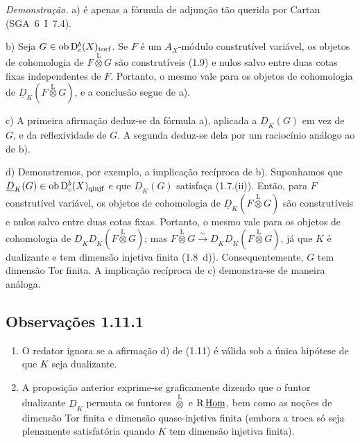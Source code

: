 \emph{Demonstração.} a) é apenas a fórmula de adjunção tão querida por Cartan (SGA~6~I~7.4).

b) Seja $G \in \operatorname{ob} \mathrm{D}_c^{b}(X)_{\mathrm{torf}}$. Se $F$ é um $A_X$-módulo construtível variável, os objetos de cohomologia de $F \mathop{\otimes}\limits^{\mathrm{L}} G$ são construtíveis (1.9) e nulos salvo entre duas cotas fixas independentes de $F$. Portanto, o mesmo vale para os objetos de cohomologia de $\underline{D}_K(F \mathop{\otimes}\limits^{\mathrm{L}} G)$, e a conclusão segue de a).

c) A primeira afirmação deduz-se da fórmula a), aplicada a $\underline{D}_K(G)$ em vez de $G$, e da reflexividade de $G$. A segunda deduz-se dela por um raciocínio análogo ao de b).

d) Demonstremos, por exemplo, a implicação recíproca de b). Suponhamos que $\underline{D}_K(G) \in \operatorname{ob} \mathrm{D}_c^{b}(X)_{\mathrm{qinjf}}$ e que $\underline{D}_K(G)$ satisfaça (1.7.(ii)). Então, para $F$ construtível variável, os objetos de cohomologia de $\underline{D}_K(F \mathop{\otimes}\limits^{\mathrm{L}} G)$ são construtíveis e nulos salvo entre duas cotas fixas. Portanto, o mesmo vale para os objetos de cohomologia de $\underline{D}_K \underline{D}_K(F \mathop{\otimes}\limits^{\mathrm{L}} G)$; mas $F \mathop{\otimes}\limits^{\mathrm{L}} G \xrightarrow{\sim} \underline{D}_K \underline{D}_K(F \mathop{\otimes}\limits^{\mathrm{L}} G)$, já que $K$ é dualizante e tem dimensão injetiva finita (1.8~d)). Consequentemente, $G$ tem dimensão Tor finita. A implicação recíproca de c) demonstra-se de maneira análoga.

\subsection*{Observações 1.11.1}
\begin{enumerate}
\item[a)] O redator ignora se a afirmação d) de (1.11) é válida sob a única hipótese de que $K$ seja dualizante.
\item[b)] A proposição anterior exprime-se graficamente dizendo que o funtor dualizante $\underline{D}_K$ permuta os funtores $\mathop{\otimes}\limits^{\mathrm{L}}$ e $\mathrm{R}\,\underline{\operatorname{Hom}}$, bem como as noções de dimensão Tor finita e dimensão quase-injetiva finita (embora a troca só seja plenamente satisfatória quando $K$ tem dimensão injetiva finita).
\end{enumerate}
